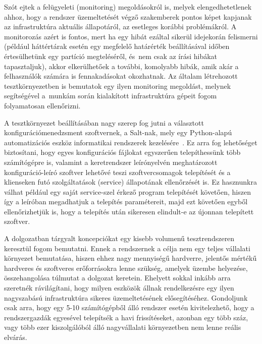 Szót ejtek a felügyeleti (monitoring) megoldásokról is, melyek elengedhetetlenek ahhoz, hogy a rendszer üzemeltetését végző szakemberek pontos képet kapjanak az infrastruktúra aktuális állapotáról, az esetleges korábbi problémákról. A monitorozás azért is fontos, mert ha egy hibát ezáltal sikerül idejekorán felismerni (például háttértárak esetén egy megfelelő határérték beállításával időben értesülhetünk egy partíció megteléséről, és~nem csak az írási hibákat tapasztaljuk), akkor elkerülhetőek a további, komolyabb hibák, amik akár a felhasználók számára is fennakadásokat okozhatnak. Az általam létrehozott tesztkörnyezetben is bemutatok egy ilyen monitoring megoldást, melynek segítségével a~munkám során kialakított infrastruktúra gépeit fogom folyamatosan ellenőrizni.

A tesztkörnyezet beállításában nagy szerep fog jutni a választott konfigurációmenedzsment szoftvernek, a Salt-nak, mely egy Python-alapú automatizációs eszköz informatikai rendszerek kezelésére~\cite{SaltAbout}. Ez arra fog lehetőséget biztosítani, hogy egyes konfigurációs \mbox{fájlokat} egyszerűen telepíthessünk több számítógépre is, valamint a keretrendszer leírónyelvén meghatározott konfiguráció-leíró szoftver lehetővé teszi szoftvercsomagok telepítését és a klienseken futó szolgáltatások (service) állapotának ellenőrzését is. Ez hasznunkra válhat például egy saját service-szel érkező program telepítését követően, hiszen így a leíróban megadhatjuk a telepítés paramétereit, majd ezt követően egyből ellenőrizhetjük is, hogy a telepítés után sikeresen elindult-e az újonnan telepített szoftver.


A dolgozatban tárgyalt koncepciókat egy kisebb volumenű tesztrendszeren keresztül fogom bemutatni. Ennek a rendszernek a célja nem egy teljes vállalati környezet bemutatása, hiszen ehhez nagy mennyiségű hardverre, jelentős mértékű hardveres és szoftveres erőforrásokra lenne szükség, amelyek üzembe helyezése, összehangolása túlmutat a dolgozat keretein.
Ehelyett sokkal inkább arra szeretnék rávilágítani, hogy milyen eszközök állnak rendelkezésre egy ilyen nagyszabású infrastruktúra sikeres üzemeltetésének elősegítéséhez. Gondoljunk csak arra, hogy egy 5-10 számítógépből álló rendszer esetén kivitelezhető, hogy a rendszergazdák egyesével telepítsék a havi frissítéseket, azonban egy több száz, vagy több ezer kiszolgálóból álló nagyvállalati környezetben nem lenne reális elvárás.

